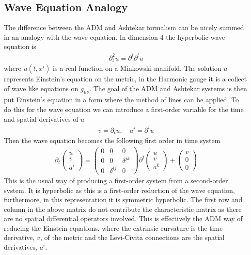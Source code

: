 \documentclass[10pt]{report}
\theoremstyle{definition}
\begin{document}
    \subsection{Wave Equation Analogy}  \label{subsec:wave-equation-analogy}
    The difference between the ADM and Ashtekar formalism can be nicely summed in an analogy with the wave equation. In dimension 4 the hyperbolic wave equation is 
    \begin{align}
        \partial^2_t u = \partial^i \partial^i u
    \end{align}
    where $u(t,x^i)$ is a real function on a Minkowski manifold. The solution $u$ represents Einstein's equation on the metric, in the Harmonic gauge it is a collect of wave like equations on $g_{\mu\nu}$. The goal of the ADM and Ashtekar systems is then put Einstein's equation in a form where the method of lines can be applied. To do this for the wave equation we can introduce a first-order variable for the time and spatial derivatives of $u$
    \begin{align}
        v = \partial_t u, \quad  a^i = \partial^i u
    \end{align}
    Then the wave equation becomes the following first order in time system 
    \begin{align}
        \partial_t \begin{pmatrix}
            u \\ v \\ a^i
        \end{pmatrix} = \begin{pmatrix}
            0 & 0 & 0 \\ 0 & 0 & \delta^{jk} \\ 0 & \delta^{ij} & 0 
        \end{pmatrix} \partial^j \begin{pmatrix}
            u \\ v \\ a^k
        \end{pmatrix} + \begin{pmatrix}
            v \\ 0 \\ 0
        \end{pmatrix}
    \end{align}
    This is the usual way of producing a first-order system from a second-order system. It is hyperbolic as this is a first-order reduction of the wave equation, furthermore, in this representation it is symmetric hyperbolic. The first row and column in the above matrix do not contribute the characteristic matrix as there are no spatial differential operators involved. This is effectively the ADM way of reducing the Einstein equations, where the extrinsic curvature is the time derivative, $v$, of the metric and the Levi-Civita connections are the spatial derivatives, $a^i$. 
\end{document}

